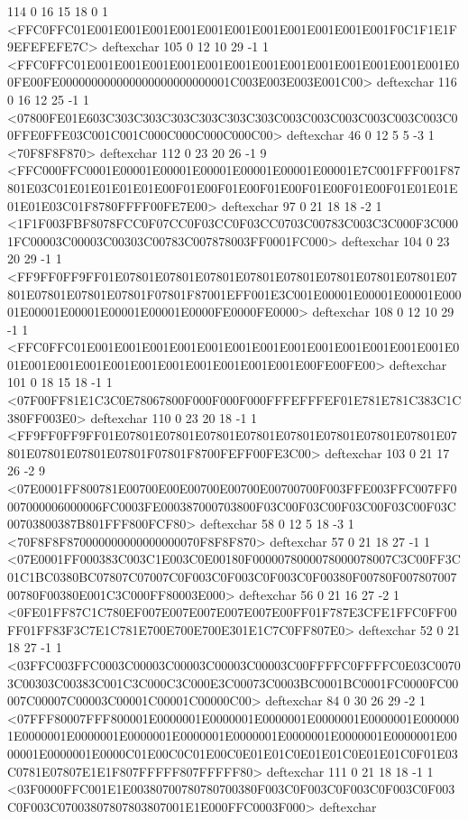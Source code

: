 114 0 16 15 18 0 1 {{<FFC0FFC01E001E001E001E001E001E001E001E001E001E001E001F0C1F1E1F9EFEFEFE7C>}} deftexchar
105 0 12 10 29 -1 1 {{<FFC0FFC01E001E001E001E001E001E001E001E001E001E001E001E001E001E00FE00FE000000000000000000000000001C003E003E003E001C00>}} deftexchar
116 0 16 12 25 -1 1 {{<07800FE01E603C303C303C303C303C303C303C003C003C003C003C003C003C00FFE0FFE03C001C001C000C000C000C000C00>}} deftexchar
46 0 12 5 5 -3 1 {{<70F8F8F870>}} deftexchar
112 0 23 20 26 -1 9 {{<FFC000FFC0001E00001E00001E00001E00001E00001E00001E7C001FFF001F87801E03C01E01E01E01E01E00F01E00F01E00F01E00F01E00F01E00F01E01E01E01E01E03C01F8780FFFF00FE7E00>}} deftexchar
97 0 21 18 18 -2 1 {{<1F1F003FBF8078FCC0F07CC0F03CC0F03CC0703C00783C003C3C000F3C0001FC00003C00003C00303C00783C007878003FF0001FC000>}} deftexchar
104 0 23 20 29 -1 1 {{<FF9FF0FF9FF01E07801E07801E07801E07801E07801E07801E07801E07801E07801E07801E07801E07801F07801F87001EFF001E3C001E00001E00001E00001E00001E00001E00001E00001E00001E0000FE0000FE0000>}} deftexchar
108 0 12 10 29 -1 1 {{<FFC0FFC01E001E001E001E001E001E001E001E001E001E001E001E001E001E001E001E001E001E001E001E001E001E001E001E001E00FE00FE00>}} deftexchar
101 0 18 15 18 -1 1 {{<07F00FF81E1C3C0E78067800F000F000F000FFFEFFFEF01E781E781C383C1C380FF003E0>}} deftexchar
110 0 23 20 18 -1 1 {{<FF9FF0FF9FF01E07801E07801E07801E07801E07801E07801E07801E07801E07801E07801E07801E07801F07801F8700FEFF00FE3C00>}} deftexchar
103 0 21 17 26 -2 9 {{<07E0001FF800781E00700E00E00700E00700E00700700F003FFE003FFC007FF0007000006000006FC0003FE000387000703800F03C00F03C00F03C00F03C00F03C00703800387B801FFF800FCF80>}} deftexchar
58 0 12 5 18 -3 1 {{<70F8F8F870000000000000000070F8F8F870>}} deftexchar
57 0 21 18 27 -1 1 {{<07E0001FF000383C003C1E003C0E00180F0000078000078000078007C3C00FF3C01C1BC0380BC07807C07007C0F003C0F003C0F003C0F00380F00780F00780700700780F00380E001C3C000FF80003E000>}} deftexchar
56 0 21 16 27 -2 1 {{<0FE01FF87C1C780EF007E007E007E007E007E00FF01F787E3CFE1FFC0FF00FF01FF83F3C7E1C781E700E700E700E301E1C7C0FF807E0>}} deftexchar
52 0 21 18 27 -1 1 {{<03FFC003FFC0003C00003C00003C00003C00003C00FFFFC0FFFFC0E03C00703C00303C00383C001C3C000C3C000E3C00073C0003BC0001BC0001FC0000FC00007C00007C00003C00001C00001C00000C00>}} deftexchar
84 0 30 26 29 -2 1 {{<07FFF80007FFF800001E0000001E0000001E0000001E0000001E0000001E0000001E0000001E0000001E0000001E0000001E0000001E0000001E0000001E0000001E0000001E0000001E0000C01E00C0C01E00C0E01E01C0E01E01C0E01E01C0F01E03C0781E07807E1E1F807FFFFF807FFFFF80>}} deftexchar
111 0 21 18 18 -1 1 {{<03F0000FFC001E1E00380700780780700380F003C0F003C0F003C0F003C0F003C0F003C07003807807803807001E1E000FFC0003F000>}} deftexchar
